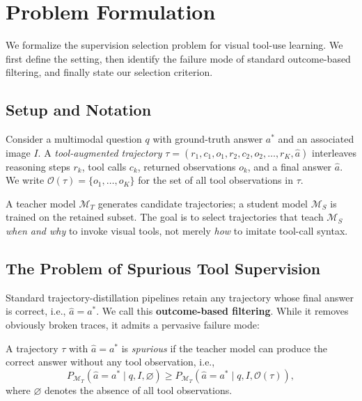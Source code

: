 \section{Problem Formulation}
\label{sec:formulation}

We formalize the supervision selection problem for visual tool-use learning.
We first define the setting, then identify the failure mode of standard outcome-based filtering, and finally state our selection criterion.

\subsection{Setup and Notation}

Consider a multimodal question $q$ with ground-truth answer $a^*$ and an associated image $I$.
A \emph{tool-augmented trajectory} $\tau = (r_1, c_1, o_1, r_2, c_2, o_2, \ldots, r_K, \hat{a})$ interleaves reasoning steps $r_k$, tool calls $c_k$, returned observations $o_k$, and a final answer $\hat{a}$.
We write $\mathcal{O}(\tau) = \{o_1, \ldots, o_K\}$ for the set of all tool observations in $\tau$.

A teacher model $\mathcal{M}_T$ generates candidate trajectories; a student model $\mathcal{M}_S$ is trained on the retained subset.
The goal is to select trajectories that teach $\mathcal{M}_S$ \emph{when and why} to invoke visual tools, not merely \emph{how} to imitate tool-call syntax.

\subsection{The Problem of Spurious Tool Supervision}

Standard trajectory-distillation pipelines retain any trajectory whose final answer is correct, i.e., $\hat{a} = a^*$.
We call this \textbf{outcome-based filtering}.
While it removes obviously broken traces, it admits a pervasive failure mode:

\begin{definition}
\label{def:spurious}
A trajectory $\tau$ with $\hat{a} = a^*$ is \emph{spurious} if the teacher model can produce the correct answer without any tool observation, i.e.,
\begin{equation}
    P_{\mathcal{M}_T}(\hat{a} = a^* \mid q, I, \varnothing) \geq P_{\mathcal{M}_T}(\hat{a} = a^* \mid q, I, \mathcal{O}(\tau)),
\end{equation}
where $\varnothing$ denotes the absence of all tool observations.
\end{definition}


